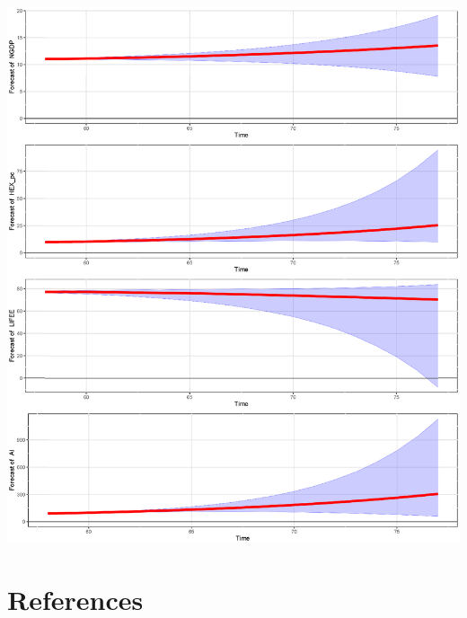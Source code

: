 \documentclass[11pt,preprint, authoryear]{elsarticle}
\let\origfigure\figure
\let\endorigfigure\endfigure
\renewenvironment{figure}[1][2] {
    \expandafter\origfigure\expandafter[H]
} {
    \endorigfigure
}
\numberwithin{equation}{section}
\numberwithin{figure}{section}
\numberwithin{table}{section}
\begin{document}
\begin{figure}
  \centering
  \includegraphics[width=\textwidth]{Forecast.eps}
  \caption{Conditional normal inverse-Wishart prior: Estimated forecasts. Periods are in years.}
  \label{for_iw}
\end{figure}

\hypertarget{references}{%
\section*{References}\label{references}}
\end{document}
